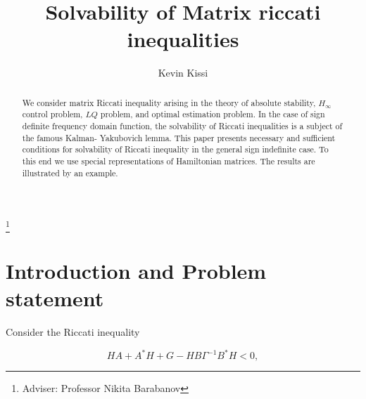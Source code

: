 \documentclass[11pt, reqno]{amsart}
\theoremstyle{plain}
\begin{document}

\title[riccati inequality ]{Solvability of Matrix riccati inequalities  }
\thanks{Adviser: Professor Nikita Barabanov}
\author[K. Kissi]{Kevin Kissi}

\address{Department of Mathematics 2750\\ North Dakota State University\\PO BOX 6050\\ Fargo, ND 58108-6050\\ USA}


%
%

\begin{abstract}
 We consider matrix Riccati inequality arising in the theory of absolute stability, $H_\infty$ control problem, $LQ$ problem, and optimal estimation problem. In the case of sign definite frequency domain function, the solvability of Riccati inequalities is a subject of the famous Kalman- Yakubovich lemma. 
This paper presents necessary and sufficient conditions for solvability of Riccati inequality in the general sign indefinite case. To this end we use special representations of Hamiltonian matrices. The results are illustrated by an example. 
\end{abstract}

%
%
\maketitle

%
%

\section{Introduction and Problem statement}

Consider the Riccati inequality

\begin{equation}\label{1}
HA + A^{*}H + G - HB\Gamma ^{-1}B^{*}H < 0,
\end{equation}
\end{document}
